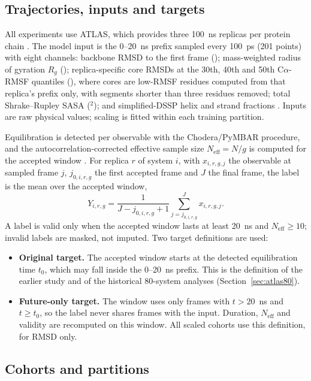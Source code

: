 \documentclass[11pt]{article}
\newcommand{\A}{\text{\AA}}
\begin{document}
\subsection{Trajectories, inputs and targets}

All experiments use ATLAS, which provides three 100~ns replicas per protein chain \cite{VanderMeersche2024ATLAS}. The model input is the 0--20~ns prefix sampled every 100~ps (201 points) with eight channels: backbone RMSD to the first frame (\A); mass-weighted radius of gyration $R_g$ (\A); replica-specific core RMSDs at the 30th, 40th and 50th C$\alpha$-RMSF quantiles (\A), where cores are low-RMSF residues computed from that replica's prefix only, with segments shorter than three residues removed; total Shrake--Rupley SASA (\A$^2$); and simplified-DSSP helix and strand fractions \cite{Kabsch1983DSSP}. Inputs are raw physical values; scaling is fitted within each training partition.

Equilibration is detected per observable with the Chodera/\allowbreak PyMBAR procedure, and the autocorrelation-corrected effective sample size $N_{\mathrm{eff}}=N/g$ is computed for the accepted window \cite{Chodera2016Equilibration}. For replica $r$ of system $i$, with $x_{i,r,g,j}$ the observable at sampled frame $j$, $j_{0,i,r,g}$ the first accepted frame and $J$ the final frame, the label is the mean over the accepted window,
\begin{equation}
  Y_{i,r,g} = \frac{1}{J-j_{0,i,r,g}+1}\sum_{j=j_{0,i,r,g}}^{J}x_{i,r,g,j}.
  \label{eq:target-mean}
\end{equation}
A label is valid only when the accepted window lasts at least 20~ns and $N_{\mathrm{eff}}\geq 10$; invalid labels are masked, not imputed. Two target definitions are used:
\begin{itemize}
\item \textbf{Original target.} The accepted window starts at the detected equilibration time $t_0$, which may fall inside the 0--20~ns prefix. This is the definition of the earlier study and of the historical 80-system analyses (Section~\ref{sec:atlas80}).
\item \textbf{Future-only target.} The window uses only frames with $t>20$~ns and $t\geq t_0$, so the label never shares frames with the input. Duration, $N_{\mathrm{eff}}$ and validity are recomputed on this window. All scaled cohorts use this definition, for RMSD only.
\end{itemize}

\subsection{Cohorts and partitions}
\end{document}
